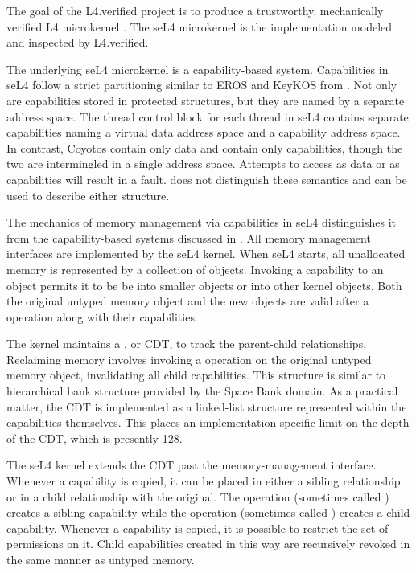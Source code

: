
The goal of the L4.verified \cite{Klein:l4.verified} project is to produce a trustworthy, mechanically verified L4 microkernel \cite{Liedtke:1996:TRM}.
The seL4 microkernel \cite{Elphinstone:formalisingukernel} is the implementation modeled and inspected by L4.verified.

The underlying seL4 microkernel is a capability-based system.
Capabilities in seL4 follow a strict partitioning similar to EROS and KeyKOS from .
Not only are capabilities stored in protected structures, but they are named by a separate address space.
The thread control block for each thread in seL4 contains separate capabilities naming a virtual data address space and a capability address space.
In contrast, Coyotos  contain only data and  contain only capabilities, though the two are intermingled in a single address space.
Attempts to access  as data or  as capabilities will result in a fault.
\TMmodelName{} does not distinguish these semantics and can be used to describe either structure.

The mechanics of memory management via capabilities in seL4 distinguishes it from the capability-based systems discussed in .
All memory management interfaces are implemented by the seL4 kernel. \cite{seL4:manual:1_3}
When seL4 starts, all unallocated memory is represented by a collection of  objects.
Invoking a capability to an  object permits it to be be  into smaller  objects or into other kernel objects.
Both the original untyped memory object and the new objects are valid after a  operation along with their capabilities.

The kernel maintains a , or CDT, to track the parent-child relationships.
Reclaiming memory involves invoking a  operation on the original untyped memory object, invalidating all child capabilities.
This structure is similar to hierarchical bank structure provided by the Space Bank domain.
As a practical matter, the CDT is implemented as a linked-list structure represented within the capabilities themselves.
This places an implementation-specific limit on the depth of the CDT, which is presently 128.

The seL4 kernel extends the CDT past the memory-management interface.
Whenever a capability is copied, it can be placed in either a sibling relationship or in a child relationship with the original.
The  operation (sometimes called ) creates a sibling capability while the  operation (sometimes called ) creates a child capability.
Whenever a capability is copied, it is possible to restrict the set of permissions on it.
Child capabilities created in this way are recursively revoked in the same manner as untyped memory.

